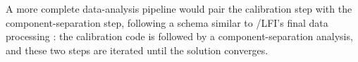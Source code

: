 \documentclass[PICOReport.tex]{subfiles}
\begin{document}
A more complete data-analysis pipeline would pair the calibration step with the component-separation step, following a schema similar to \planck/LFI's final data processing \cite{Planck2018_II}: the calibration code is followed by a component-separation analysis, and these two steps are iterated until the solution converges. 



\end{document}
